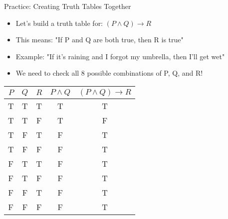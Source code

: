 \documentclass{beamer}
\begin{document}
	\begin{frame}{Practice: Creating Truth Tables Together}
		\begin{itemize}
			\item Let's build a truth table for: $(P \land Q) \rightarrow R$
			\item This means: "If P and Q are both true, then R is true"
			\item Example: "If it's raining and I forgot my umbrella, then I'll get wet"
			\item We need to check all 8 possible combinations of P, Q, and R!
		\end{itemize}
		
		\begin{table}
			\centering
			\small
			\begin{tabular}{|c|c|c|c|c|}
				\hline
				$P$ & $Q$ & $R$ & $P \land Q$ & $(P \land Q) \rightarrow R$ \\
				\hline
				T & T & T & T & T \\
				T & T & F & T & F \\
				T & F & T & F & T \\
				T & F & F & F & T \\
				F & T & T & F & T \\
				F & T & F & F & T \\
				F & F & T & F & T \\
				F & F & F & F & T \\
				\hline
			\end{tabular}
		\end{table}
	\end{frame}
	
\end{document}
